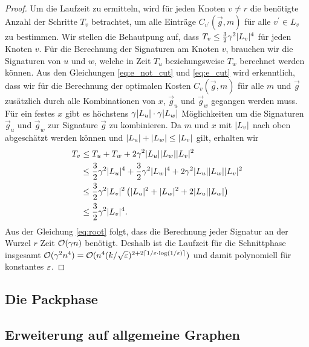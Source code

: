 \begin{proof}
    Um die Laufzeit zu ermitteln, wird für jeden Knoten $v \neq r$ die benötigte Anzahl der Schritte $T_v$ betrachtet, um alle Einträge $C_{v^\prime}(\vec{g}, m)$ für alle $v^\prime \in L_v$ zu bestimmen. 
    Wir stellen die Behautpung auf, dass $T_v \leq \frac{3}{2} \gamma^2 \lvert L_v\rvert^4$ für jeden Knoten $v$.
    Für die Berechnung der Signaturen am Knoten $v$, brauchen wir die Signaturen von $u$ und $w$, welche in Zeit $T_u$ beziehungsweise $T_w$ berechnet werden können.
    Aus den Gleichungen \eqref{eq:e_not_cut} und \eqref{eq:e_cut} wird erkenntlich, dass wir für die Berechnung der optimalen Kosten $C_v(\vec{g}, m)$ für alle $m$ und $\vec{g}$ zusätzlich durch alle Kombinationen von $x$, $\vec{g}_u$ und $\vec{g}_w$ gegangen werden muss.
    Für ein festes $x$ gibt es höchstens $\gamma \lvert L_u\rvert \cdot \gamma \lvert L_w\rvert$ Möglichkeiten um die Signaturen $\vec{g}_u$ und $\vec{g}_w$ zur Signature $\vec{g}$ zu kombinieren.
    Da $m$ und $x$ mit $\lvert L_v\rvert$ nach oben abgeschätzt werden können und $\lvert L_u\rvert + \lvert L_w\rvert \leq \lvert L_v\rvert$ gilt, erhalten wir
    \begin{equation*}
        \begin{aligned}
            T_v & \leq T_u + T_w + 2\gamma^2 \lvert L_u\rvert \lvert L_w\rvert \lvert L_v\rvert^2 \\
                & \leq \frac{3}{2} \gamma^2 \lvert L_u\rvert^4 + \frac{3}{2} \gamma^2 \lvert L_w\rvert^4 + 2\gamma^2 \lvert L_u\rvert \lvert L_w\rvert \lvert L_v\rvert^2 \\
                & \leq \frac{3}{2} \gamma^2 \lvert L_v\rvert^2 \left(\lvert L_u\rvert^2 + \lvert L_w\rvert^2 + 2 \lvert L_u\rvert \lvert L_w\rvert \right) \\
                & \leq \frac{3}{2} \gamma^2 \lvert L_v\rvert^4.
        \end{aligned}
    \end{equation*}
    Aus der Gleichung \eqref{eq:root} folgt, dass die Berechnung jeder Signatur an der Wurzel $r$ Zeit $\mathcal{O}(\gamma n)$ benötigt.
    Deshalb ist die Laufzeit für die Schnittphase insgesamt $\mathcal{O}(\gamma^2 n^4) = \mathcal{O}(n^4(k/\sqrt{\varepsilon})^{2+2 \lceil1/\varepsilon \cdot \log(1/\varepsilon)\rceil})$ und damit polynomiell für konstantes $\varepsilon$.
\end{proof}
\subsection{Die Packphase}
\subsection{Erweiterung auf allgemeine Graphen}


